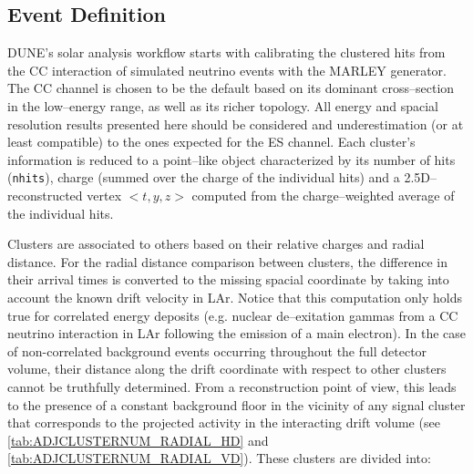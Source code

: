 \subsection{Event Definition}\label{sec:EVENT_DEFINITION}
\ac{DUNE}'s solar analysis workflow starts with calibrating the clustered hits from the \ac{CC} interaction of simulated neutrino events with the MARLEY generator. The \ac{CC} channel is chosen to be the default based on its dominant cross--section in the low--energy range, as well as its richer topology. All energy and spacial resolution results presented here should be considered and underestimation (or at least compatible) to the ones expected for the \ac{ES} channel. Each cluster's information is reduced to a point--like object characterized by its number of hits (\texttt{nhits}), charge (summed over the charge of the individual hits) and a 2.5D--reconstructed vertex $<t, y, z>$ computed from the charge--weighted average of the individual hits.

\begin{table}[ht]
    \centering
    \begin{minipage}{0.45\linewidth}
        \centering
        
        \caption{\ac{HD} average number of adjacent clusters per primary signal cluster as a function of their 3D--distance for the lateralAPA background scenario.\label{tab:ADJCLUSTERNUM_RADIAL_HD}} 
    \end{minipage}\hfill
    \begin{minipage}{0.45\linewidth}
        \centering
        
        \caption{\ac{VD} average number of adjacent clusters per primary cluster as a function of their 3D--distance for the nominal background scenario.\label{tab:ADJCLUSTERNUM_RADIAL_VD}} 
    \end{minipage}
\end{table}

Clusters are associated to others based on their relative charges and radial distance. For the radial distance comparison between clusters, the difference in their arrival times is converted to the missing spacial coordinate by taking into account the known drift velocity in \ac{LAr}. Notice that this computation only holds true for correlated energy deposits (e.g. nuclear de--exitation gammas from a \ac{CC} neutrino interaction in \ac{LAr} following the emission of a main electron). In the case of non-correlated background events occurring throughout the full detector volume, their distance along the drift coordinate with respect to other clusters cannot be truthfully determined. From a reconstruction point of view, this leads to the presence of a constant background floor in the vicinity of any signal cluster that corresponds to the projected activity in the interacting drift volume (see \cref{tab:ADJCLUSTERNUM_RADIAL_HD} and \cref{tab:ADJCLUSTERNUM_RADIAL_VD}). These clusters are divided into:

